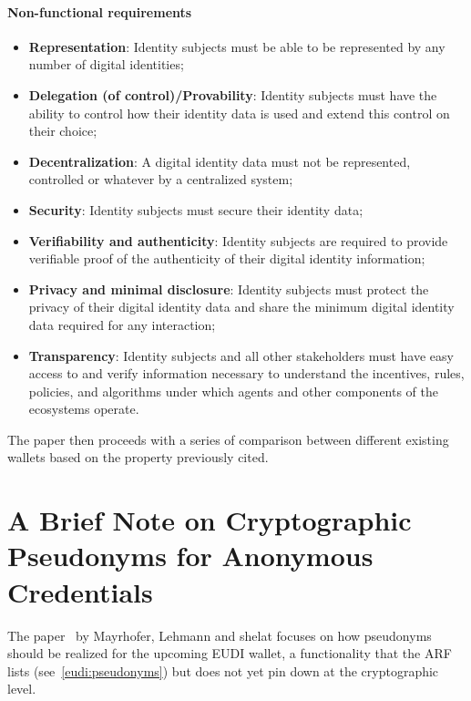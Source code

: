 \documentclass[binding=0.6cm,oneside,noexaminfo]{sapthesis}
\begin{document}
\paragraph{Non-functional requirements}
\begin{itemize}
      \item \textbf{Representation}: Identity subjects must be able to be represented by any number of digital identities;
      \item \textbf{Delegation (of control)/Provability}: Identity subjects must have the ability to control how their identity data is used and extend this control on their choice;
      \item \textbf{Decentralization}: A digital identity data must not be represented, controlled or whatever by a centralized system;
      \item \textbf{Security}: Identity subjects must secure their identity data;
      \item \textbf{Verifiability and authenticity}: Identity subjects are required to provide verifiable proof of the authenticity of their digital identity information;
      \item \textbf{Privacy and minimal disclosure}: Identity subjects must protect the privacy of their digital identity data and share the minimum digital identity data required for any interaction;
      \item \textbf{Transparency}: Identity subjects and all other stakeholders must have easy access to and verify information necessary to understand the incentives, rules, policies, and  algorithms under which agents and other components of the ecosystems operate.
\end{itemize}
The paper then proceeds with a series of comparison between different existing wallets
based on the property previously cited.
\section{A Brief Note on Cryptographic Pseudonyms for Anonymous Credentials}
\label{cryptographicpseudonyms}
The paper~\cite{Mayrhofer2025BriefNote} by Mayrhofer, Lehmann and shelat focuses on how pseudonyms
should be realized for the upcoming EUDI wallet, a functionality that the ARF lists (see~\cref{eudi:pseudonyms})
but does not yet pin down at the cryptographic level.
\end{document}

